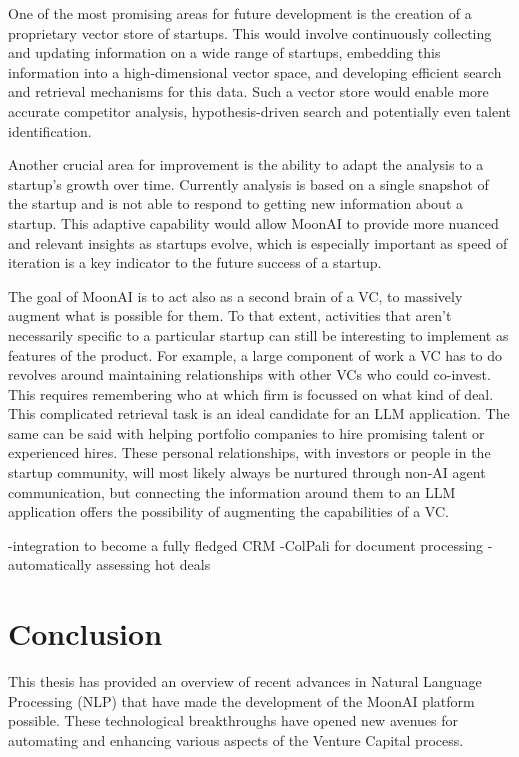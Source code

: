 \documentclass[a4paper, oneside]{discothesis}
\begin{document}
One of the most promising areas for future development is the creation of a proprietary vector store of startups. This would involve continuously collecting and updating information on a wide range of startups, embedding this information into a high-dimensional vector space, and developing efficient search and retrieval mechanisms for this data. Such a vector store would enable more accurate competitor analysis, hypothesis-driven search and potentially even talent identification.

Another crucial area for improvement is the ability to adapt the analysis to a startup's growth over time. Currently analysis is based on a single snapshot of the startup and is not able to respond to getting new information about a startup. This adaptive capability would allow MoonAI to provide more nuanced and relevant insights as startups evolve, which is especially important as speed of iteration is a key indicator to the future success of a startup. 

The goal of MoonAI is to act also as a second brain of a VC, to massively augment what is possible for them. To that extent, activities that aren't necessarily specific to a particular startup can still be interesting to implement as features of the product. For example, a large component of work a VC has to do revolves around maintaining relationships with other VCs who could co-invest. This requires remembering who at which firm is focussed on what kind of deal. This complicated retrieval task is an ideal candidate for an LLM application. The same can be said with helping portfolio companies to hire promising talent or experienced hires. These personal relationships, with investors or people in the startup community, will most likely always be nurtured through non-AI agent communication, but connecting the information around them to an LLM application offers the possibility of augmenting the capabilities of a VC. 

-integration to become a fully fledged CRM
-ColPali for document processing
-automatically assessing hot deals

\chapter{Conclusion}

This thesis has provided an overview of recent advances in Natural Language Processing (NLP) that have made the development of the MoonAI platform possible. These technological breakthroughs have opened new avenues for automating and enhancing various aspects of the Venture Capital process.
\end{document}
